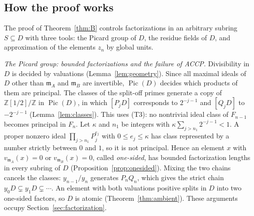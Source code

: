 \documentclass[11pt]{article}
\theoremstyle{plain}
\theoremstyle{definition}
\theoremstyle{remark}
\DeclareMathOperator{\Pic}{Pic}
\newcommand{\Z}{\mathbb Z}
\newcommand{\EA}{\mathfrak m_A}
\newcommand{\EB}{\mathfrak m_B}
\begin{document}
\subsection{How the proof works}\label{sec:intro-strategy}

The proof of Theorem~\ref{thm:B} controls factorizations in an arbitrary
subring $S\subseteq D$ with three tools: the Picard group of $D$, the
residue fields of $D$, and approximation of the elements $z_n$ by global
units.

\emph{The Picard group: bounded factorizations and the failure of ACCP.}
Divisibility in $D$ is decided by valuations
(Lemma~\ref{lem:geometry}).  Since all maximal ideals of $D$ other than
$\EA$ and $\EB$ are invertible, $\Pic(D)$ decides which products of them
are principal.  The classes of the split-off primes generate a copy of
$\Z[1/2]/\Z$ in $\Pic(D)$, in which $[P_jD]$ corresponds to $2^{-j-1}$ and
$[Q_jD]$ to $-2^{-j-1}$ (Lemma~\ref{lem:classes}).  This uses (T3): no
nontrivial ideal class of $F_{n-1}$ becomes principal in $F_n$.  Let
$\kappa$ and $n_1$ be integers with $\kappa\sum_{j>n_1}2^{-j-1}<1$.  A
proper nonzero ideal $\prod_{j>n_1}P_j^{e_j}$ with $0\le e_j\le\kappa$ has
class represented by a number strictly between $0$ and $1$, so it is not
principal.  Hence an element $x$
with $v_{\EA}(x)=0$ or $v_{\EB}(x)=0$, called \emph{one-sided}, has bounded
factorization lengths in every subring of $D$
(Proposition~\ref{prop:onesided}).  Mixing the two chains cancels the
classes: $y_{n-1}/y_n$ generates $P_nQ_n$, which gives the strict chain
$y_0D\subsetneq y_1D\subsetneq\cdots$.  An element with both valuations
positive splits in $D$ into two one-sided factors, so $D$ is atomic
(Theorem~\ref{thm:ambient}).  These arguments occupy
Section~\ref{sec:factorization}.
\end{document}
